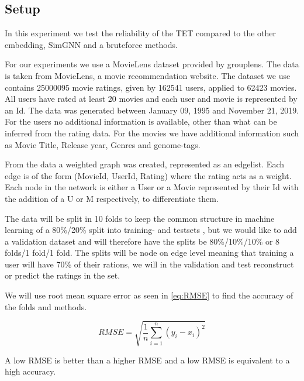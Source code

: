 \subsection{Setup}
In this experiment we test the reliability of the TET compared to the other embedding, SimGNN and a bruteforce methods. 

For our experiments we use a MovieLens dataset provided by grouplens\cite{Grouplensdata}. The data is taken from MovieLens, a movie recommendation website. The dataset we use contains 25000095 movie ratings, given by 162541 users, applied to 62423 movies. All users have rated at least 20 movies and each user and movie is represented by an Id. The data was generated between January 09, 1995 and November 21, 2019. For the users no additional information is available, other than what can be inferred from the rating data. For the movies we have additional information such as Movie Title, Release year, Genres and genome-tags.

From the data a weighted graph was created, represented as an edgelist. Each edge is of the form (MovieId, UserId, Rating) where the rating acts as a weight. Each node in the network is either a User or a Movie represented by their Id with the addition of a U or M respectively, to differentiate them.

The data will be split in 10 folds to keep the common structure in machine learning of a 80\%/20\% split into training- and testsets \cite{Ricci2015}, but we would like to add a validation dataset and will therefore have the splits be 80\%/10\%/10\% or 8 folds/1 fold/1 fold. The splits will be node on edge level meaning that training a user will have 70\% of their rations, we will in the validation and test reconstruct or predict the ratings in the set.

We will use root mean square error as seen in \autoref{eq:RMSE}\cite{chai2014root} to find the accuracy of the folds and methods.

\begin{equation}\label{eq:RMSE}
RMSE = \sqrt{\frac{1}{n}\sum^n_{i=1}(y_i - x_i)^2}
\end{equation}

A low RMSE is better than a higher RMSE and a low RMSE is equivalent to a high accuracy.

